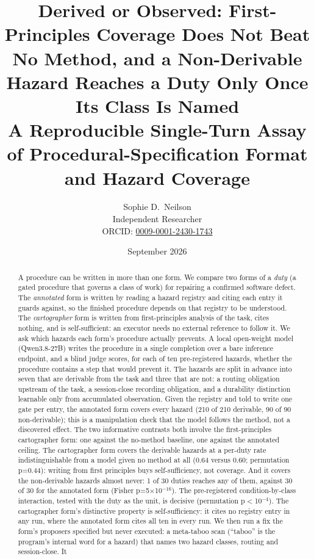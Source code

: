 \documentclass[11pt,a4paper]{article}
\title{%
  Derived or Observed: First-Principles Coverage Does Not Beat No Method, and a Non-Derivable Hazard Reaches a Duty Only Once Its Class Is Named \\
  A Reproducible Single-Turn Assay of Procedural-Specification Format and Hazard Coverage%
}
\author{Sophie D.\ Neilson \\
  \small Independent Researcher \\
  \small ORCID: \href{https://orcid.org/0009-0001-2430-1743}{0009-0001-2430-1743}
}
\date{September 2026}
\begin{document}
\maketitle

\begin{abstract}
A procedure can be written in more than one form. We compare two forms of a
\emph{duty} (a gated procedure that governs a class of work) for repairing
a confirmed software defect. The \emph{annotated} form is written by reading a
hazard registry and citing each entry it guards against, so the finished
procedure depends on that registry to be understood. The \emph{cartographer}
form is written from first-principles analysis of the task, cites nothing, and
is self-sufficient: an executor needs no external reference to follow it. We ask
which hazards each form's procedure actually prevents. A local open-weight model
(Qwen3.8-27B) writes the procedure in a single completion over a bare inference
endpoint, and a blind judge scores, for each of ten pre-registered hazards,
whether the procedure contains a step that would prevent it. The hazards are
split in advance into seven that are derivable from the task and three that are
not: a routing obligation upstream of the task, a session-close recording
obligation, and a durability distinction learnable only from accumulated
observation. Given the registry and told to write one gate per entry, the
annotated form covers every hazard (210 of 210 derivable, 90 of 90
non-derivable); this is a manipulation check that the model follows the method,
not a discovered effect. The two informative contrasts both involve the
first-principles cartographer form: one against the no-method baseline, one
against the annotated ceiling. The cartographer form covers the derivable hazards
at a per-duty rate indistinguishable from a model given no method at all (0.64
versus 0.60; permutation p=0.44): writing from first principles buys
self-sufficiency, not coverage. And it covers the non-derivable hazards almost
never: 1 of 30 duties reaches any of them, against 30 of 30 for the annotated
form (Fisher p=5$\times$10$^{-16}$). The pre-registered condition-by-class
interaction, tested with the duty as the unit, is decisive (permutation
p$<$10$^{-4}$). The cartographer form's distinctive property is self-sufficiency:
it cites no registry entry in any run, where the annotated form cites all ten in
every run. We then run a fix the form's proposers specified but never executed: a
meta-taboo scan (``taboo'' is the program's internal word for a hazard) that
names two hazard classes, routing and session-close. It

\end{abstract}
\end{document}
